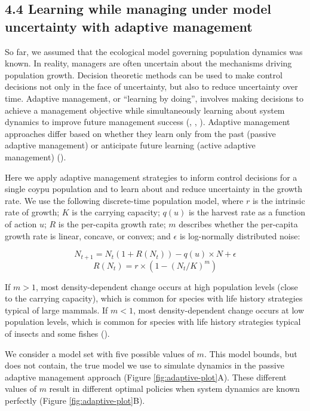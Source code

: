 \documentclass[
  11pt,
  a4paper,
]{article}
\begin{document}
\subsection{4.4 Learning while managing under model uncertainty with adaptive management}\label{learning-while-managing-under-model-uncertainty-with-adaptive-management}

So far, we assumed that the ecological model governing population dynamics was known. In reality, managers are often uncertain about the mechanisms driving population growth. Decision theoretic methods can be used to make control decisions not only in the face of uncertainty, but also to reduce uncertainty over time. Adaptive management, or ``learning by doing'', involves making decisions to achieve a management objective while simultaneously learning about system dynamics to improve future management success (, , ). Adaptive management approaches differ based on whether they learn only from the past (passive adaptive management) or anticipate future learning (active adaptive management) ().

Here we apply adaptive management strategies to inform control decisions for a single coypu population and to learn about and reduce uncertainty in the growth rate. We use the following discrete-time population model, where \(r\) is the intrinsic rate of growth; \(K\) is the carrying capacity; \(q(u)\) is the harvest rate as a function of action \(u\); \(R\) is the per-capita growth rate; \(m\) describes whether the per-capita growth rate is linear, concave, or convex; and \(\epsilon\) is log-normally distributed noise:

\[
N_{t+1} = N_t(1 + R(N_t)) - q(u) \times N + \epsilon
\]
\[
R(N_t) = r \times (1 - (N_t / K) ^ m)
\]

If \(m > 1\), most density-dependent change occurs at high population levels (close to the carrying capacity), which is common for species with life history strategies typical of large mammals. If \(m < 1\), most density-dependent change occurs at low population levels, which is common for species with life history strategies typical of insects and some fishes ().

We consider a model set with five possible values of \(m\). This model bounds, but does not contain, the true model we use to simulate dynamics in the passive adaptive management approach (Figure \ref{fig:adaptive-plot}A). These different values of \(m\) result in different optimal policies when system dynamics are known perfectly (Figure \ref{fig:adaptive-plot}B).
\end{document}
